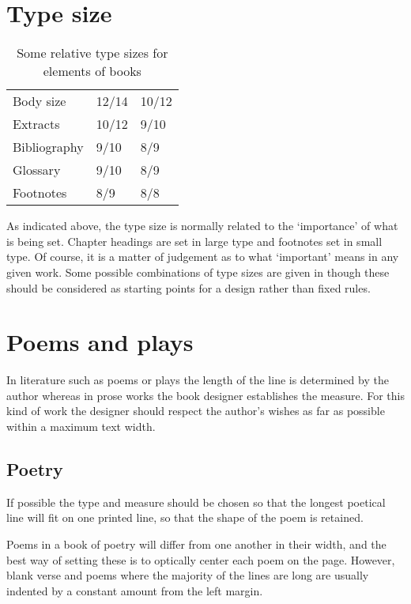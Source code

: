 \documentclass[10pt,letterpaper,extrafontsizes]{memoir}
\begin{document}
\section{Type size}

\begin{table}
\centering
\caption{Some relative type sizes for elements of books}\label{tab:reltypesizing}
\begin{tabular}{lll} \toprule
Body size & 12/14  & 10/12 \\
Extracts  & 10/12 &  9/10 \\
Bibliography & 9/10 & 8/9 \\
Glossary     & 9/10 & 8/9 \\
Footnotes   & 8/9 & 8/8 \\
\bottomrule
\end{tabular}
\end{table}

    As indicated above, the type size is normally related to the `importance' 
of what is being set. Chapter headings are set in large type and footnotes 
set in small type. Of course, it is a matter of judgement as to what 
`important' means in any given work. Some possible combinations of type sizes
are given in  though these should be considered as
starting points for a design rather than fixed rules.

\section{Poems and plays}

    In literature such as poems or plays 
the length of the line is determined
by the author whereas in prose works the book designer establishes the measure.
For this kind of work the designer should respect the author's wishes as 
far as possible within a maximum text width.

\subsection{Poetry}

    If possible the type and measure should be chosen so that the longest
poetical line will fit on one printed line, so that the shape of the poem
is retained.

    Poems in a book of poetry will differ from one another in their width, 
and the best way of setting these is to optically center each poem on the 
page. However, blank verse and poems where the majority of the lines are
long are usually indented by a constant amount from the left margin.
\end{document}
